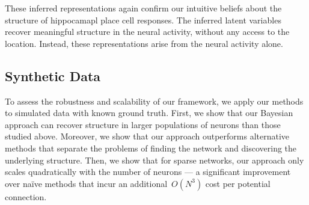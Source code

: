 These inferred representations again confirm our intuitive beliefs 
about the structure of hippocamapl place cell responses. The 
inferred latent variables recover meaningful structure in the
neural activity, without any access to the location. Instead, 
these representations arise from the neural activity alone.

\subsection{Synthetic Data}
\label{sec:synthetic}

To assess the robustness and scalability of our framework, we apply
our methods to simulated data with known ground truth.  First, we show
that our Bayesian approach can recover structure in larger populations
of neurons than those studied above.  Moreover, we show that our
approach outperforms alternative methods that separate the problems of
finding the network and discovering the underlying structure. Then, we
show that for sparse networks, our approach only scales quadratically
with the number of neurons --- a significant improvement over na\"ive
methods that incur an additional~$O(N^3)$ cost per potential connection.


